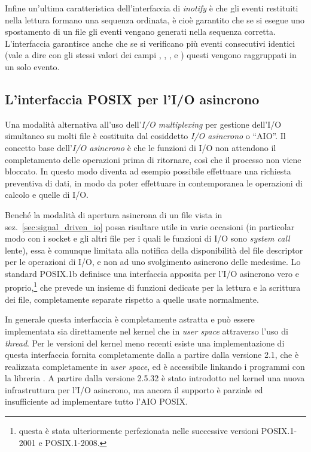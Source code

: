 Infine un'ultima caratteristica dell'interfaccia di \textit{inotify} è che gli
eventi restituiti nella lettura formano una sequenza ordinata, è cioè
garantito che se si esegue uno spostamento di un file gli eventi vengano
generati nella sequenza corretta. L'interfaccia garantisce anche che se si
verificano più eventi consecutivi identici (vale a dire con gli stessi valori
dei campi , , , e ) questi vengono
raggruppati in un solo evento.




\subsection{L'interfaccia POSIX per l'I/O asincrono}
\label{sec:file_asyncronous_io}

Una modalità alternativa all'uso dell'\textit{I/O multiplexing} per gestione
dell'I/O simultaneo su molti file è costituita dal cosiddetto \textsl{I/O
  asincrono} o ``AIO''. Il concetto base dell'\textsl{I/O asincrono} è che le
funzioni di I/O non attendono il completamento delle operazioni prima di
ritornare, così che il processo non viene bloccato.  In questo modo diventa ad
esempio possibile effettuare una richiesta preventiva di dati, in modo da
poter effettuare in contemporanea le operazioni di calcolo e quelle di I/O.

Benché la modalità di apertura asincrona di un file vista in
sez.~\ref{sec:signal_driven_io} possa risultare utile in varie occasioni (in
particolar modo con i socket e gli altri file per i quali le funzioni di I/O
sono \textit{system call} lente), essa è comunque limitata alla notifica della
disponibilità del file descriptor per le operazioni di I/O, e non ad uno
svolgimento asincrono delle medesime.  Lo standard POSIX.1b definisce una
interfaccia apposita per l'I/O asincrono vero e proprio,\footnote{questa è
  stata ulteriormente perfezionata nelle successive versioni POSIX.1-2001 e
  POSIX.1-2008.} che prevede un insieme di funzioni dedicate per la lettura e
la scrittura dei file, completamente separate rispetto a quelle usate
normalmente.

In generale questa interfaccia è completamente astratta e può essere
implementata sia direttamente nel kernel che in \textit{user space} attraverso
l'uso di \textit{thread}. Per le versioni del kernel meno recenti esiste una
implementazione di questa interfaccia fornita completamente dalla 
a partire dalla versione 2.1, che è realizzata completamente in \textit{user
  space}, ed è accessibile linkando i programmi con la libreria
. A partire dalla versione 2.5.32 è stato introdotto nel kernel
una nuova infrastruttura per l'I/O asincrono, ma ancora il supporto è parziale
ed insufficiente ad implementare tutto l'AIO POSIX.

